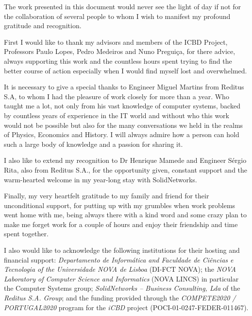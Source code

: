 \acknowledgements

The work presented in this document would never see the light of day if not for the collaboration of several people to whom I wish to manifest my profound gratitude and recognition. 

First I would like to thank my advisors and members of the ICBD Project, Professors Paulo Lopes, Pedro Medeiros and Nuno Preguiça, for there advice, always supporting this work and the countless hours spent trying to find the better course of action especially when I would find myself lost and overwhelmed.

It is necessary to give a special thanks to Engineer Miguel Martins from Reditus S.A, to whom I had the pleasure of work closely for more than a year. Who taught me a lot, not only from his vast knowledge of computer systems, backed by countless years of experience in the IT world and without who this work would not be possible but also for the many conversations we held in the realms of Physics, Economics and History. I will always admire how a person can hold such a large body of knowledge and a passion for sharing it.

I also like to extend my recognition to Dr Henrique Mamede and Engineer Sérgio Rita, also from Reditus S.A., for the opportunity given, constant support and the warm-hearted welcome in my year-long stay with SolidNetworks.

Finally, my very heartfelt gratitude to my family and friend for their unconditional support, for putting up with my grumbles when work problems went home with me, being always there with a kind word and some crazy plan to make me forget work for a couple of hours and enjoy their friendship and time spent together.

I also would like to acknowledge the following institutions for their hosting and financial support: \textit{Departamento de Informática and Faculdade de Ciências e Tecnologia of the Universidade NOVA de Lisboa} (DI-FCT NOVA); the \textit{NOVA Laboratory of Computer Science and Informatics} (NOVA LINCS) in particular the Computer Systems group; \textit{SolidNetworks – Business Consulting, Lda} of the \textit{Reditus S.A. Group}; and the funding provided through the \textit{COMPETE2020 / PORTUGAL2020} program for the \textit{iCBD} project (POCI-01-0247-FEDER-011467).